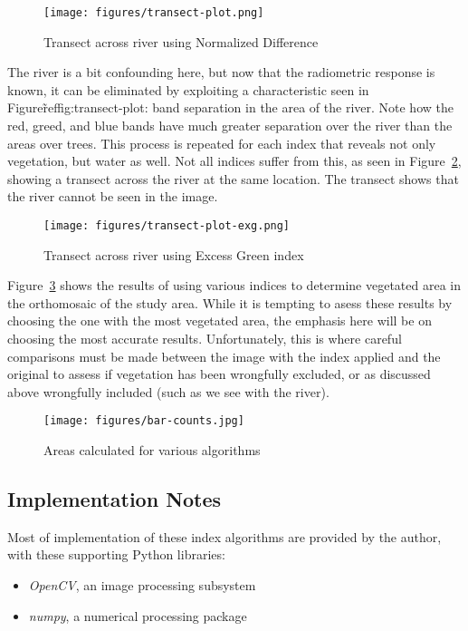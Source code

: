 \documentclass[letterpaper]{article}
\begin{document}
{\begin{figure}[H]
\centering
  	\texttt{[image: figures/transect-plot.png]}
  	\label{fig:exgexr}
  \caption{Transect across river using Normalized Difference}
    \label{fig:transect-plot} 
\end{figure}

The river is a bit confounding here, but now that the radiometric response is known, it can be eliminated by exploiting a characteristic seen in Figure\~ref{fig:transect-plot}: band separation in the area of the river.  Note how the red, greed, and blue bands have much greater separation over the river than the areas over trees.  This process is repeated for each index that reveals not only vegetation, but water as well. Not all indices suffer from this, as seen in Figure~\ref{fig:transect-plot-exg}, showing a transect across the river at the same location.  The transect shows that the river cannot be seen in the image.

\begin{figure}[H]
\centering
  \texttt{[image: figures/transect-plot-exg.png]}
  \caption{Transect across river using Excess Green index}
  \label{fig:transect-plot-exg} 
\end{figure}

Figure~\ref{fig:barcount} shows the results of using various indices to determine vegetated area in the orthomosaic of the study area.  While it is tempting to asess these results by choosing the one with the most vegetated area, the emphasis here will be on choosing the most accurate results. Unfortunately, this is where careful comparisons must be made between the image with the index applied and the original to assess if vegetation has been wrongfully excluded, or as discussed above wrongfully included (such as we see with the river).

\begin{figure}[H]
\centering
  	\texttt{[image: figures/bar-counts.jpg]}
  	 \caption{Areas calculated for various algorithms}
  	\label{fig:barcount}
\end{figure}


\subsection{Implementation Notes}
Most of implementation of these index algorithms are provided by the author, with these supporting Python libraries:
\begin{itemize}
\item{{\it OpenCV}, an image processing subsystem}
\item{{\it numpy}, a numerical processing package}
\end{itemize}


}
\end{document}
